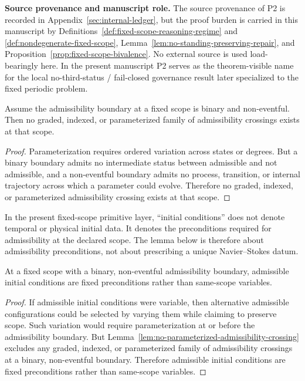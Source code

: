 \noindent\textbf{Source provenance and manuscript role.} The source provenance of P2 is recorded in Appendix~\ref{sec:internal-ledger}, but the proof burden is carried in this manuscript by Definitions~\ref{def:fixed-scope-reasoning-regime} and \ref{def:nondegenerate-fixed-scope}, Lemma~\ref{lem:no-standing-preserving-repair}, and Proposition~\ref{prop:fixed-scope-bivalence}. No external source is used load-bearingly here. In the present manuscript P2 serves as the theorem-visible name for the local no-third-status / fail-closed governance result later specialized to the fixed periodic problem.

\begin{lemma}\label{lem:no-parameterized-admissibility-crossing}
Assume the admissibility boundary at a fixed scope is binary and non-eventful. Then no graded, indexed, or parameterized family of admissibility crossings exists at that scope.
\end{lemma}

\begin{proof}
Parameterization requires ordered variation across states or degrees. But a binary boundary admits no intermediate status between admissible and not admissible, and a non-eventful boundary admits no process, transition, or internal trajectory across which a parameter could evolve. Therefore no graded, indexed, or parameterized admissibility crossing exists at that scope.
\end{proof}

\begin{remark}\label{rem:primitive-initial-conditions}
In the present fixed-scope primitive layer, ``initial conditions'' does not denote temporal or physical initial data. It denotes the preconditions required for admissibility at the declared scope. The lemma below is therefore about admissibility preconditions, not about prescribing a unique Navier--Stokes datum.
\end{remark}

\begin{lemma}\label{lem:admissible-initial-conditions-not-variables}
At a fixed scope with a binary, non-eventful admissibility boundary, admissible initial conditions are fixed preconditions rather than same-scope variables.
\end{lemma}

\begin{proof}
If admissible initial conditions were variable, then alternative admissible configurations could be selected by varying them while claiming to preserve scope. Such variation would require parameterization at or before the admissibility boundary. But Lemma~\ref{lem:no-parameterized-admissibility-crossing} excludes any graded, indexed, or parameterized family of admissibility crossings at a binary, non-eventful boundary. Therefore admissible initial conditions are fixed preconditions rather than same-scope variables.
\end{proof}

